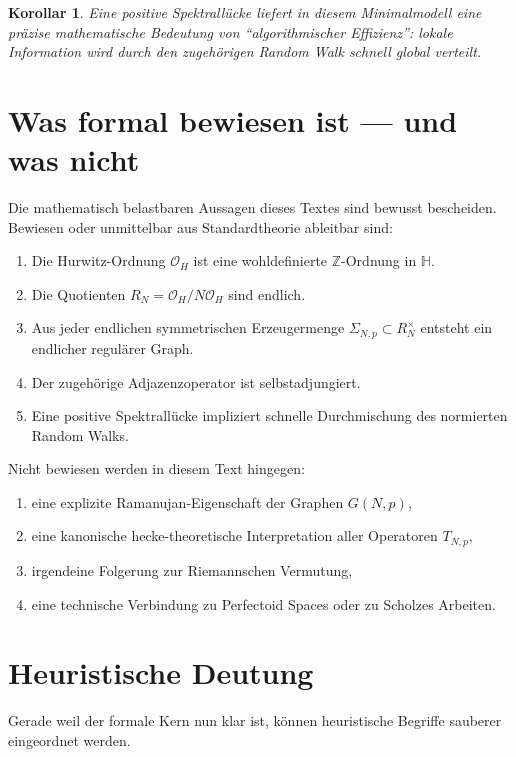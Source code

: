 \documentclass[12pt,a4paper]{article}
\newcommand{\HH}{\mathbb{H}}
\newcommand{\ZZ}{\mathbb{Z}}
\newcommand{\OO}{\mathcal{O}}
\newtheorem{corollary}[theorem]{Korollar}
\theoremstyle{definition}
\begin{document}
	\begin{corollary}
		Eine positive Spektrallücke liefert in diesem Minimalmodell eine präzise mathematische Bedeutung von ``algorithmischer Effizienz'': lokale Information wird durch den zugehörigen Random Walk schnell global verteilt.
	\end{corollary}
	
	\section{Was formal bewiesen ist — und was nicht}
	
	Die mathematisch belastbaren Aussagen dieses Textes sind bewusst bescheiden. Bewiesen oder unmittelbar aus Standardtheorie ableitbar sind:
	
	\begin{enumerate}[label=\arabic*.]
		\item Die Hurwitz-Ordnung \(\OO_H\) ist eine wohldefinierte \(\ZZ\)-Ordnung in \(\HH\).
		\item Die Quotienten \(R_N=\OO_H/N\OO_H\) sind endlich.
		\item Aus jeder endlichen symmetrischen Erzeugermenge \(\Sigma_{N,p}\subset R_N^\times\) entsteht ein endlicher regulärer Graph.
		\item Der zugehörige Adjazenzoperator ist selbstadjungiert.
		\item Eine positive Spektrallücke impliziert schnelle Durchmischung des normierten Random Walks.
	\end{enumerate}
	
	Nicht bewiesen werden in diesem Text hingegen:
	
	\begin{enumerate}[label=\arabic*.]
		\item eine explizite Ramanujan-Eigenschaft der Graphen \(G(N,p)\),
		\item eine kanonische hecke-theoretische Interpretation aller Operatoren \(T_{N,p}\),
		\item irgendeine Folgerung zur Riemannschen Vermutung,
		\item eine technische Verbindung zu Perfectoid Spaces oder zu Scholzes Arbeiten.
	\end{enumerate}
	
	\section{Heuristische Deutung}
	
	Gerade weil der formale Kern nun klar ist, können heuristische Begriffe sauberer eingeordnet werden.
	
\end{document}
